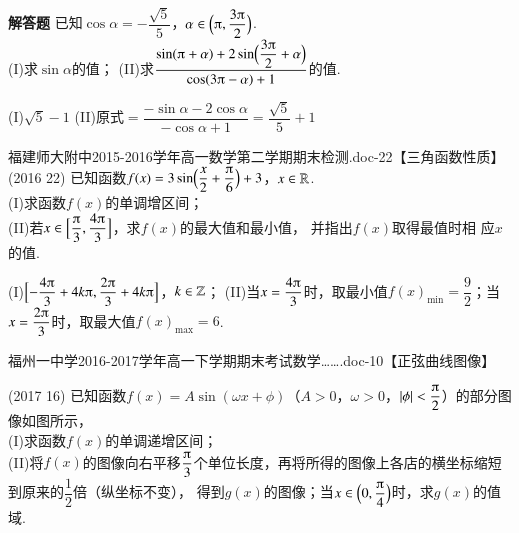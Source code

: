 \begin{exercise}{\bf 解答题}
      已知$\cos\alpha=-\dfrac{\sqrt5}5$，$\alpha\in\Bp{\piup,\dfracp{3}2}$.\\
      (I)求$\sin\alpha$的值；
      (II)求$\dfrac{\sin(\piup+\alpha)+2\sin\Bp{\dfracp{3}2+\alpha}}{\cos(3\piup-\alpha)+1}$的值.
      \begin{answer}
        (I)$\sqrt5-1$
        (II)原式$=\dfrac{-\sin\alpha-2\cos\alpha}{-\cos\alpha+1}=\dfrac{\sqrt5}5+1$
      \end{answer}
    \item 福建师大附中2015-2016学年高一数学第二学期期末检测.doc-22【三角函数性质】\\
      (2016  22)
      已知函数$f(x)=3\sin\Bp{\dfrac{x}2+\dfrac{\piup}6}+3$，$x\in\mathbb{R}$.\\
      (I)求函数$f(x)$的单调增区间；\\
      (II)若$x\in\Bigl[\dfrac{\piup}3,\dfrac{4\piup}3\Bigr]$，求$f(x)$的最大值和最小值，
      并指出$f(x)$取得最值时相
      应$x$的值.
      \begin{answer}
        (I)$\Bigl[-\dfrac{4\piup}3+4k\piup,\dfrac{2\piup}3+4k\piup\Bigr]$，$k\in\mathbb{Z}$；
        (II)当$x=\dfrac{4\piup}3$时，取最小值$f(x)_{\min}=\dfrac92$；当$x=\dfrac{2\piup}3$时，取最大值$f(x)_{\max}=6$.
      \end{answer}
    \item 福州一中学2016-2017学年高一下学期期末考试数学…….doc-10【正弦曲线图像】\\
      \begin{minipage}[t]{0.7\linewidth}
        \vspace{-1.2cm}
        (2017  16)
        已知函数$f(x)=A\sin(\omega x+\phi)$（$A>0$，$\omega>0$，$\abs{\phi}<\dfrac{\piup}2$）的部分图像如图所示，\\
        (I)求函数$f(x)$的单调递增区间；\\
        (II)将$f(x)$的图像向右平移$\dfrac{\piup}3$个单位长度，再将所得的图像上各店的横坐标缩短到原来的$\dfrac12$倍（纵坐标不变），
        得到$g(x)$的图像；当$x\in\Bp{0,\dfrac{\piup}4}$时，求$g(x)$的值域.
      \end{minipage}\hfill
      \begin{minipage}[h]{0.3\linewidth}
        \begin{center}
\end{center}
\end{minipage}
\end{exercise}

